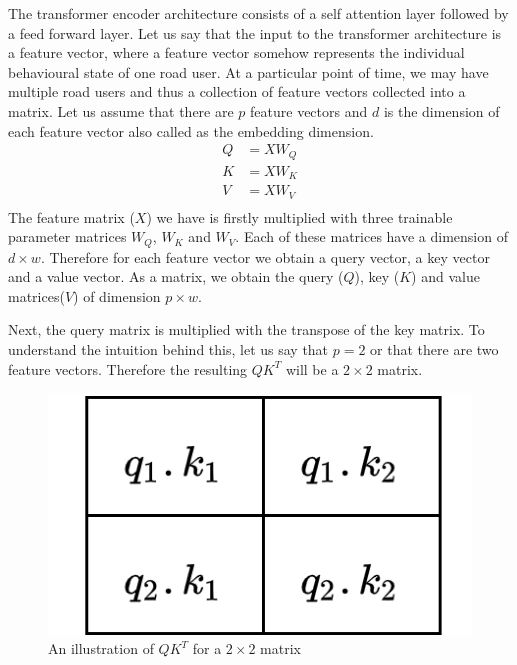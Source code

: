 \documentclass{article}
\begin{document}
The transformer encoder architecture consists of a self attention layer followed by a feed forward layer. Let us say that the input to the transformer architecture is a feature vector, where a feature vector somehow represents the individual behavioural state of one road user. At a particular point of time, we may have multiple road users and thus a collection of feature vectors collected into a matrix. Let us assume that there are $p$ feature vectors and $d$ is the dimension of each feature vector also called as the embedding dimension. 
\begin{equation}
    \begin{split}
        Q&=XW_Q\\
        K&=XW_K\\
        V&=XW_V\\
    \end{split}
\end{equation}
The feature matrix ($X$) we have is firstly multiplied with three trainable parameter matrices $W_Q$, $W_K$ and $W_V$. Each of these matrices have a dimension of $d \times w$. Therefore for each feature vector we obtain a query vector, a key vector and a value vector. As a matrix, we obtain the query ($Q$), key ($K$) and value matrices($V$) of dimension $p \times w$. 

Next, the query matrix is multiplied with the transpose of the key matrix. To understand the intuition behind this, let us say that $p=2$ or that there are two feature vectors. Therefore the resulting $QK^T$ will be a $2 \times 2$ matrix. 
\begin{figure}[H]
\centering
\includegraphics[scale=0.4]{theory/example.png}
\caption{An illustration of $QK^T$ for a $2 \times 2$ matrix}
\label{fig:transformer-example}
\end{figure}
\end{document}
